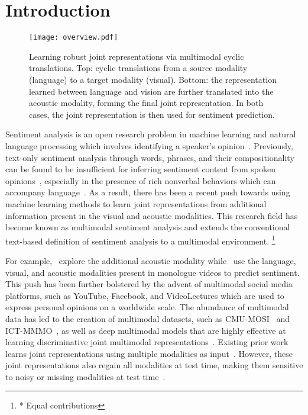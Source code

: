 \documentclass[letterpaper]{article} %
\newcommand{\citep}{\cite}
\newcommand\blfootnote[1]{%
  \begingroup
  \renewcommand\thefootnote{}\footnote{#1}%
  \addtocounter{footnote}{-1}%
  \endgroup
}
\begin{document}
\section{Introduction}

\begin{figure}[ht]
\centering
\texttt{[image: overview.pdf]}
\caption{
\small
{Learning robust joint representations via multimodal cyclic translations. Top: cyclic translations from a source modality (language) to a target modality (visual). Bottom: the representation learned between language and vision are further translated into the acoustic modality, forming the final joint representation. In both cases, the joint representation is then used for sentiment prediction.}}
\label{fig:overview}
\end{figure}

Sentiment analysis is an open research problem in machine learning and natural language processing which involves identifying a speaker's opinion~\cite{Pang:2002:TUS:1118693.1118704}. Previously, text-only sentiment analysis through words, phrases, and their compositionality can be found to be insufficient for inferring sentiment content from spoken opinions~\citep{morency2011towards}, especially in the presence of rich nonverbal behaviors which can accompany language~\citep{shaffer2018exploring}. As a result, there has been a recent push towards using machine learning methods to learn joint representations from additional information present in the visual and acoustic modalities. This research field has become known as multimodal sentiment analysis and extends the conventional text-based definition of sentiment analysis to a multimodal environment.\blfootnote{* Equal contributions} For example,~\citep{kaushik2013sentiment} explore the additional acoustic modality while~\citep{wollmer2013youtube} use the language, visual, and acoustic modalities present in monologue videos to predict sentiment. This push has been further bolstered by the advent of multimodal social media platforms, such as YouTube, Facebook, and VideoLectures which are used to express personal opinions on a worldwide scale. The abundance of multimodal data has led to the creation of multimodal datasets, such as CMU-MOSI~\citep{zadeh2016multimodal} and ICT-MMMO~\citep{wollmer2013youtube}, as well as deep multimodal models that are highly effective at learning discriminative joint multimodal representations~\citep{localglobal,factorized,chen2017msa}. Existing prior work learns joint representations using multiple modalities as input~\citep{multistage,morency2011towards,zadeh2016multimodal}. However, these joint representations also regain all modalities at test time, making them sensitive to noisy or missing modalities at test time~\citep{DBLP:conf/cvpr/Tran0ZJ17,Cai:2018:DAL:3219819.3219963}.
\end{document}

